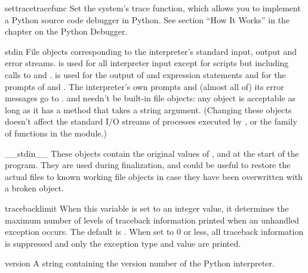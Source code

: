 \begin{funcdesc}{settrace}{tracefunc}
  Set the system's trace function, which allows you to implement a
  Python source code debugger in Python.  See section ``How It Works''
  in the chapter on the Python Debugger.
\end{funcdesc}

\begin{datadesc}{stdin}
  File objects corresponding to the interpreter's standard input,
  output and error streams.   is used for all
  interpreter input except for scripts but including calls to
   and
  .   is used
  for the output of  and expression statements and for the
  prompts of  and .  The interpreter's
  own prompts and (almost all of) its error messages go to
  .   and  needn't
  be built-in file objects: any object is acceptable as long as it has
  a  method that takes a string argument.  (Changing these
  objects doesn't affect the standard I/O streams of processes
  executed by ,  or the
   family of functions in the  module.)
\end{datadesc}

\begin{datadesc}{__stdin__}
These objects contain the original values of ,
 and  at the start of the program.  They are 
used during finalization, and could be useful to restore the actual
files to known working file objects in case they have been overwritten
with a broken object.
\end{datadesc}

\begin{datadesc}{tracebacklimit}
When this variable is set to an integer value, it determines the
maximum number of levels of traceback information printed when an
unhandled exception occurs.  The default is .  When set to
0 or less, all traceback information is suppressed and only the
exception type and value are printed.
\end{datadesc}

\begin{datadesc}{version}
A string containing the version number of the Python interpreter.
\end{datadesc}
